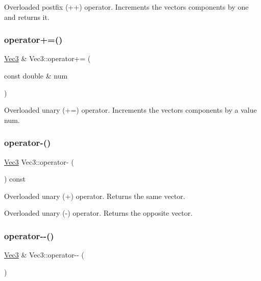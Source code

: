 Overloaded postfix (++) operator. Increments the vectors components by one and returns it. 

\mbox{\label{classVec3_a7e84982381bd5c28104d1da23e01de05}} 
\subsubsection{\texorpdfstring{operator+=()}{operator+=()}}
{\footnotesize\ttfamily \mbox{\hyperlink{classVec3}{Vec3}} \& Vec3\+::operator+= (\begin{DoxyParamCaption}\item[{const double \&}]{num }\end{DoxyParamCaption})}



Overloaded unary (+=) operator. Increments the vector\textquotesingle{}s components by a value num. 

\mbox{\label{classVec3_ab05753413af282b8cbd879c334c8e5aa}} 
\subsubsection{\texorpdfstring{operator-\/()}{operator-()}}
{\footnotesize\ttfamily \mbox{\hyperlink{classVec3}{Vec3}} Vec3\+::operator-\/ (\begin{DoxyParamCaption}{ }\end{DoxyParamCaption}) const\hspace{0.3cm}{\ttfamily [inline]}}



Overloaded unary (+) operator. Returns the same vector. 

Overloaded unary (-\/) operator. Returns the opposite vector. \mbox{\label{classVec3_a520715cf438384a71bbdb4a47476501d}} 
\subsubsection{\texorpdfstring{operator-\/-\/()}{operator--()}\hspace{0.1cm}{\footnotesize\ttfamily [1/2]}}
{\footnotesize\ttfamily \mbox{\hyperlink{classVec3}{Vec3}} \& Vec3\+::operator-\/-\/ (\begin{DoxyParamCaption}{ }\end{DoxyParamCaption})}



